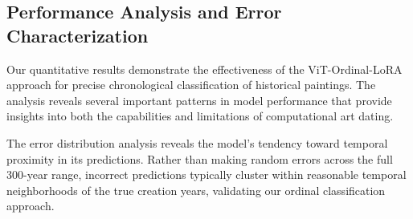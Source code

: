 \documentclass[10pt,twocolumn,letterpaper]{article}
\begin{document}
\subsection{Performance Analysis and Error Characterization}


Our quantitative results demonstrate the effectiveness of the ViT-Ordinal-LoRA approach for precise chronological classification of historical paintings. The analysis reveals several important patterns in model performance that provide insights into both the capabilities and limitations of computational art dating.

The error distribution analysis reveals the model's tendency toward temporal proximity in its predictions. Rather than making random errors across the full 300-year range, incorrect predictions typically cluster within reasonable temporal neighborhoods of the true creation years, validating our ordinal classification approach.

\end{document}
